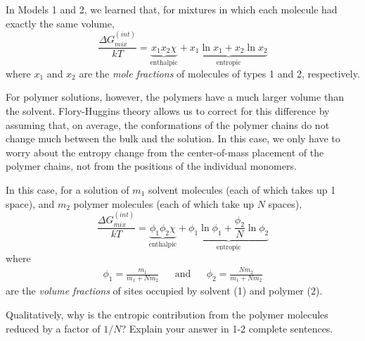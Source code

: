 \begin{activity}
\begin{model}

In Models 1 and 2, we learned that, for mixtures in which each molecule had exactly the same volume,
\begin{equation*}
	\frac{\Delta G_{mix}^{(int)}}{kT} = \underbrace{x_1 x_2 \chi}_{\text{enthalpic}} + \underbrace{x_1 \ln x_1 + x_2 \ln x_2}_{\text{entropic}}
\end{equation*}
where $x_1$ and $x_2$ are the \emph{mole fractions} of molecules of types 1 and 2, respectively.

For polymer solutions, however, the polymers have a much larger volume than the solvent.  Flory-Huggins theory allows us to correct for this difference by assuming that, on average, the conformations of the polymer chains do not change much between the bulk and the solution. In this case, we only have to worry about the entropy change from the center-of-mass placement of the polymer chains, not from the positions of the individual monomers.

In this case, for a solution of $m_1$ solvent molecules (each of which takes up 1 space), and $m_2$ polymer molecules (each of which take up $N$ spaces),  
\begin{equation*}
	\frac{\Delta G_{mix}^{(int)}}{kT} = \underbrace{\phi_1 \phi_2 \chi}_{\text{enthalpic}} + \underbrace{\phi_1 \ln \phi_1 + \frac{\phi_2}{N} \ln \phi_2}_{\text{entropic}}
\end{equation*}
where
\begin{align*}
	\phi_1 = \frac{m_1}{m_1 + N m_2} && \text{and} && \phi_2 = \frac{N m_2}{m_1 + N m_2}
\end{align*}
are the \emph{volume fractions} of sites occupied by solvent (1) and polymer (2).
\end{model}

\begin{ctqs}

		\question Qualitatively, why is the entropic contribution from the polymer molecules reduced by a factor of $1/N$? Explain your answer in 1-2 complete sentences.
		
			\begin{solution}[1.75in]
			\end{solution}

		

\end{ctqs}
\end{activity}

